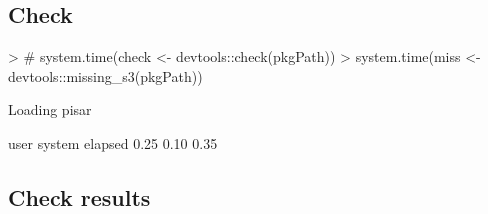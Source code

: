 \documentclass[a4paper,12pt]{article}\usepackage[]{graphicx}\usepackage[]{color}
\begin{document}
\subsection{Check}
\begin{Schunk}
\begin{Sinput}
> # system.time(check <- devtools::check(pkgPath))
> system.time(miss <- devtools::missing_s3(pkgPath))
\end{Sinput}
\begin{Soutput}
Loading pisar
\end{Soutput}
\begin{Soutput}
   user  system elapsed 
   0.25    0.10    0.35 
\end{Soutput}
\end{Schunk}
\clearpage
\subsection{Check results}
\end{document}
